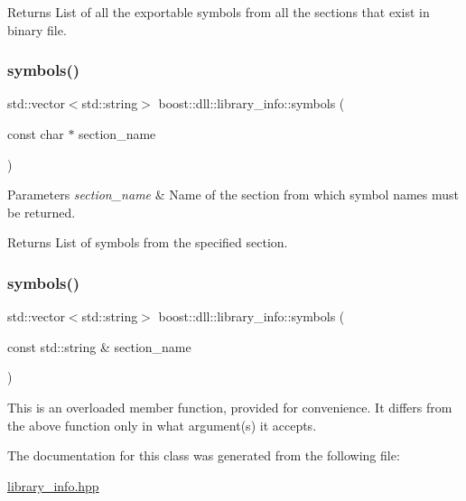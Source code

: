 \begin{DoxyReturn}{Returns}
List of all the exportable symbols from all the sections that exist in binary file. 
\end{DoxyReturn}
\mbox{\label{a01704_a89875161fa1edb4b95aa80380b471436}} 
\subsubsection{\texorpdfstring{symbols()}{symbols()}\hspace{0.1cm}{\footnotesize\ttfamily [2/3]}}
{\footnotesize\ttfamily std\+::vector$<$std\+::string$>$ boost\+::dll\+::library\+\_\+info\+::symbols (\begin{DoxyParamCaption}\item[{const char $\ast$}]{section\+\_\+name }\end{DoxyParamCaption})\hspace{0.3cm}{\ttfamily [inline]}}


\begin{DoxyParams}{Parameters}
{\em section\+\_\+name} & Name of the section from which symbol names must be returned. \\
\hline
\end{DoxyParams}
\begin{DoxyReturn}{Returns}
List of symbols from the specified section. 
\end{DoxyReturn}
\mbox{\label{a01704_ac6bac9eeab1e0ac0202172d61302045b}} 
\subsubsection{\texorpdfstring{symbols()}{symbols()}\hspace{0.1cm}{\footnotesize\ttfamily [3/3]}}
{\footnotesize\ttfamily std\+::vector$<$std\+::string$>$ boost\+::dll\+::library\+\_\+info\+::symbols (\begin{DoxyParamCaption}\item[{const std\+::string \&}]{section\+\_\+name }\end{DoxyParamCaption})\hspace{0.3cm}{\ttfamily [inline]}}

This is an overloaded member function, provided for convenience. It differs from the above function only in what argument(s) it accepts. 

The documentation for this class was generated from the following file\+:\begin{DoxyCompactItemize}
\item 
\hyperlink{a00263}{library\+\_\+info.\+hpp}\end{DoxyCompactItemize}
